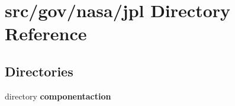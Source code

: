 \section{src/gov/nasa/jpl Directory Reference}
\label{dir_da14fc6f06c52a7751b22b055d3b40b8}
\subsection*{Directories}
\begin{DoxyCompactItemize}
\item 
directory {\bf componentaction}
\end{DoxyCompactItemize}
